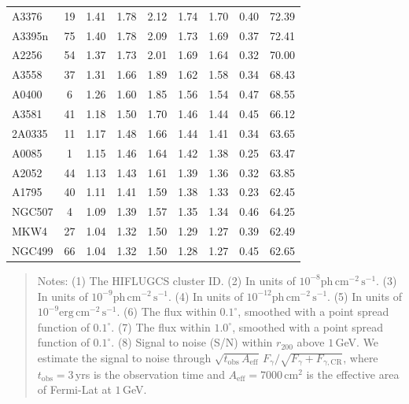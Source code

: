 \documentclass[10pt,aps,pra,reprint,amsmath,amsfonts,amssymb,showpacs,nofootinbib,floatfix]{revtex4-1}
\newcommand{\rmn}{\mathrm}
\newcommand{\cm}{\rmn{cm}}
\newcommand{\CR}{\rmn{CR}}
\newcommand{\rvir}{r_{200}}
\begin{document}
\begin{table}
\begin{minipage}{2.0\columnwidth}
\begin{tabular}{l  c c c c c c c c}
A3376    &  19 &   1.41 &   1.78 &   2.12 &   1.74 &   1.70 &   0.40 &  72.39 \\
A3395n   &  75 &   1.40 &   1.78 &   2.09 &   1.73 &   1.69 &   0.37 &  72.41 \\
A2256    &  54 &   1.37 &   1.73 &   2.01 &   1.69 &   1.64 &   0.32 &  70.00 \\
A3558    &  37 &   1.31 &   1.66 &   1.89 &   1.62 &   1.58 &   0.34 &  68.43 \\
A0400    &   6 &   1.26 &   1.60 &   1.85 &   1.56 &   1.54 &   0.47 &  68.55 \\
A3581    &  41 &   1.18 &   1.50 &   1.70 &   1.46 &   1.44 &   0.45 &  66.12 \\
2A0335   &  11 &   1.17 &   1.48 &   1.66 &   1.44 &   1.41 &   0.34 &  63.65 \\
A0085    &   1 &   1.15 &   1.46 &   1.64 &   1.42 &   1.38 &   0.25 &  63.47 \\
A2052    &  44 &   1.13 &   1.43 &   1.61 &   1.39 &   1.36 &   0.32 &  63.85 \\
A1795    &  40 &   1.11 &   1.41 &   1.59 &   1.38 &   1.33 &   0.23 &  62.45 \\
NGC507   &   4 &   1.09 &   1.39 &   1.57 &   1.35 &   1.34 &   0.46 &  64.25 \\
MKW4     &  27 &   1.04 &   1.32 &   1.50 &   1.29 &   1.27 &   0.39 &  62.49 \\
NGC499   &  66 &   1.04 &   1.32 &   1.50 &   1.28 &   1.27 &   0.45 &  62.65 \\
\hline
\hline
\end{tabular}
\begin{quote}
  Notes: 
   (1) The HIFLUGCS cluster ID.
   (2) In units of  $10^{-8} \rmn{ph}\,\rmn{cm}^{-2}\,\rmn{s}^{-1}$.
   (3) In units of  $10^{-9} \rmn{ph}\,\rmn{cm}^{-2}\,\rmn{s}^{-1}$.
   (4) In units of  $10^{-12} \rmn{ph}\,\rmn{cm}^{-2}\,\rmn{s}^{-1}$.
   (5) In units of  $10^{-9} \rmn{erg}\,\rmn{cm}^{-2}\,\rmn{s}^{-1}$.
   (6) The flux within $0.1^\circ$, smoothed with a point spread function of $0.1^\circ$. 
   (7) The flux within $1.0^\circ$, smoothed with a point spread function of $0.1^\circ$. 
   (8) Signal to noise (S/N) within $\rvir$ above $1\,$GeV. We estimate the signal to 
  noise through $\sqrt{t_\rmn{obs}\,A_\rmn{eff}}\,F_{\gamma}/\sqrt{F_{\gamma}+F_{\gamma,\CR}}$, 
  where $t_\rmn{obs}=3\,$yrs is the observation time and $A_\rmn{eff} = 7000\,\cm^2$ 
    is the effective area of Fermi-Lat at $1\,$GeV.
 \label{tab:flux_tab_LP}
  \end{quote}
\end{minipage}
\end{table} 
\end{document}
